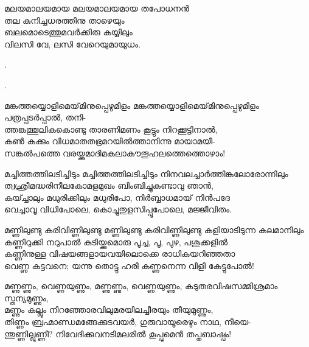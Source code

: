 \begin{enumerate}


\begin{slokam}{\VDv}{\Ull}{മലയമാലയമായ}
മലയമാലയമായ തപോധനന്‍\\
തല കുനിച്ചധരത്തിനു താഴെയും\\
ബലമൊടെത്തുമവര്‍ക്കിരു കയ്യിലും\\
വിലസി വേ, ലസി വേറെയുമായുധം.
\end{slokam}


.

. 


\begin{slokam}{\VSv}{\NNM}{മങ്കത്തയ്യൊളിമെയ്‌മിനുപ്പെഴുമിളം}
മങ്കത്തയ്യൊളിമെയ്‌മിനുപ്പെഴുമിളം പത്രപ്പടർപ്പാൽ, തനി-\\
ത്തങ്കത്തൂലികകൊണ്ടു താരണിമണം കൂട്ടും നിറക്കൂട്ടിനാൽ,\\
കൺ കക്കും വിധമാതതഭ്രമറയിൽത്താനിന്നു മായാമയീ-\\
സങ്കൽപത്തെ വരയ്ക്കുമാദിമകലാകൗതൂഹലത്തെത്തൊഴാം!
\end{slokam}


\begin{slokam}{\VSv}{\VKG}{മച്ചിത്തത്തിലടിച്ചിടും}
 മച്ചിത്തത്തിലടിച്ചിടും നിനവലച്ചാർത്തിങ്കലോരോന്നിലും\\
ത്വഛ്രീമദ്ധരിനീലകോമളമുഖം ബിംബിച്ചുകണ്ടാവു ഞാൻ,\\
കയ്ച്ചാലും മധുരിക്കിലും മധുരിപോ, നിർബ്ബാധമായ്‌ നിൻപദേ\\
വെച്ചാവൂ വിധിപോലെ, കൊച്ചുതുളസിപ്പൂപോലെ, മജ്ജീവിതം.
\end{slokam}



\begin{slokam}{\VKm}{\PCM}{മണ്ണിലുണ്ടു കരിവിണ്ണിലുണ്ടു}
 മണ്ണിലുണ്ടു കരിവിണ്ണിലുണ്ടു കളിയാടിടുന്ന കലമാനിലും\\
കണ്ണിറുക്കി നറുപാൽ കുടിയ്ക്കുമൊരു പൂച്ച, പൂ, പുഴ, പശുക്കളിൽ\\
കണ്ണിനുള്ള വിഷയങ്ങളായവയിലൊക്കെ രാധികയറിഞ്ഞതാ\\
വെണ്ണ കട്ടവനെ; യന്നു തൊട്ടു ഹരി കണ്ണനെന്ന വിളി കേട്ടുപോൽ!
\end{slokam}


\begin{slokam}{\VSr}{\VKG}{മണ്ണുണ്ണും, വെണ്ണയുണ്ണും,}
മണ്ണുണ്ണും, വെണ്ണയുണ്ണും, കടുതരവിഷസമ്മിശ്രമാം സ്തന്യമുണ്ണും,\\
മണ്ണും കല്ലും നിറഞ്ഞോരവിലുമരയിലച്ചീരയും തീയുമുണ്ണും,\\
തിണ്ണം ബ്രഹ്മാണ്ഡമങ്ങേക്കുടവയർ, ഗുരുവായൂരെഴും നാഥ, നീയെ-\\
ന്തുണ്ണില്ലുണ്ണീ? നിവേദിക്കുവനടിമലരിൽ കൂപ്പുമെൻ തപ്തബാഷ്പം!
\end{slokam}


\end{enumerate}
